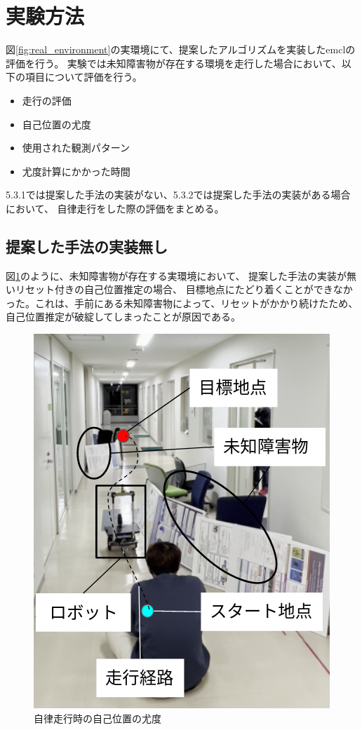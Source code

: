 \section{実験方法}

図\ref{fig:real_environment}の実環境にて、提案したアルゴリズムを実装したemclの評価を行う。
実験では未知障害物が存在する環境を走行した場合において、以下の項目について評価を行う。
\begin{itemize}
  \item 走行の評価
  \item 自己位置の尤度
  \item 使用された観測パターン
  \item 尤度計算にかかった時間
\end{itemize}
5.3.1では提案した手法の実装がない、5.3.2では提案した手法の実装がある場合において、
自律走行をした際の評価をまとめる。

\subsection{提案した手法の実装無し}

図\ref{fig:nav_no_imp_real}のように、未知障害物が存在する実環境において、
提案した手法の実装が無いリセット付きの自己位置推定の場合、
目標地点にたどり着くことができなかった。これは、手前にある未知障害物によって、リセットがかかり続けたため、
自己位置推定が破綻してしまったことが原因である。

\begin{figure}[H]
  \begin{center}
    \includegraphics[width=0.5\linewidth]{figs/real_environment.png}
    \caption{自律走行時の自己位置の尤度}
    \label{fig:nav_no_imp_real}
  \end{center}
\end{figure}

